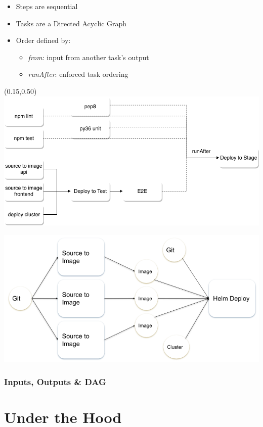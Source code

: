 \documentclass[aspectratio=169,11pt,hyperref={colorlinks=true}]{beamer}
\begin{document}
\begin{lblackrwhiteframe}
\begin{blackframe}
\begin{2columnsframe}
  {
    \begin{itemize}
      \item Steps are sequential
      \item Tasks are a Directed Acyclic Graph
      \item Order defined by:
      \begin{itemize}
        \item {\em from}: input from another task's output
        \item {\em runAfter}: enforced task ordering
      \end{itemize}
    \end{itemize}
    \begin{textblock*}{0.8\paperwidth}(0.15\paperwidth,0.50\paperheight)
      \includegraphics[width=0.45\paperwidth]{img/test-pipeline.png}
    \end{textblock*}
  }
  {
    \includegraphics[width=0.4\paperwidth]{img/pipeline.png}
  }
  \frametitle{Inputs, Outputs \& DAG}
\end{2columnsframe}

\section{Under the Hood}


\end{blackframe}
\end{lblackrwhiteframe}
\end{document}
